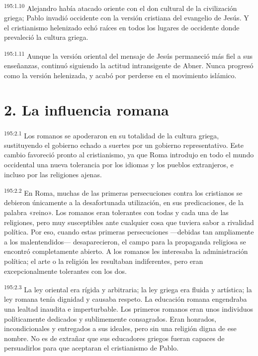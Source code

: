 \par
\textsuperscript{195:1.10} Alejandro había atacado oriente con el don cultural de la civilización griega; Pablo invadió occidente con la versión cristiana del evangelio de Jesús. Y el cristianismo helenizado echó raíces en todos los lugares de occidente donde prevaleció la cultura griega.

\par
\textsuperscript{195:1.11} Aunque la versión oriental del mensaje de Jesús permaneció más fiel a sus enseñanzas, continuó siguiendo la actitud intransigente de Abner. Nunca progresó como la versión helenizada, y acabó por perderse en el movimiento islámico.

\section*{2. La influencia romana}
\par
\textsuperscript{195:2.1} Los romanos se apoderaron en su totalidad de la cultura griega, sustituyendo el gobierno echado a suertes por un gobierno representativo. Este cambio favoreció pronto al cristianismo, ya que Roma introdujo en todo el mundo occidental una nueva tolerancia por los idiomas y los pueblos extranjeros, e incluso por las religiones ajenas.

\par
\textsuperscript{195:2.2} En Roma, muchas de las primeras persecuciones contra los cristianos se debieron únicamente a la desafortunada utilización, en sus predicaciones, de la palabra «reino». Los romanos eran tolerantes con todas y cada una de las religiones, pero muy susceptibles ante cualquier cosa que tuviera sabor a rivalidad política. Por eso, cuando estas primeras persecuciones ---debidas tan ampliamente a los malentendidos--- desaparecieron, el campo para la propaganda religiosa se encontró completamente abierto. A los romanos les interesaba la administración política; el arte o la religión les resultaban indiferentes, pero eran excepcionalmente tolerantes con los dos.

\par
\textsuperscript{195:2.3} La ley oriental era rígida y arbitraria; la ley griega era fluida y artística; la ley romana tenía dignidad y causaba respeto. La educación romana engendraba una lealtad inaudita e imperturbable. Los primeros romanos eran unos individuos políticamente dedicados y sublimemente consagrados. Eran honrados, incondicionales y entregados a sus ideales, pero sin una religión digna de ese nombre. No es de extrañar que sus educadores griegos fueran capaces de persuadirlos para que aceptaran el cristianismo de Pablo.

